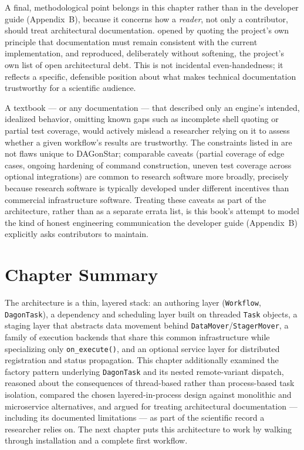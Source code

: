 A final, methodological point belongs in this chapter rather than in the
developer guide (Appendix~B), because it concerns how a \emph{reader},
not only a contributor, should treat architectural documentation.
 opened by quoting the project's own principle that
documentation must remain consistent with the current implementation, and
 reproduced, deliberately without softening, the
project's own list of open architectural debt. This is not incidental
even-handedness; it reflects a specific, defensible position about what
makes technical documentation trustworthy for a scientific audience.

A textbook --- or any documentation --- that described only an engine's
intended, idealized behavior, omitting known gaps such as incomplete shell
quoting or partial test coverage, would actively mislead a researcher
relying on it to assess whether a given workflow's results are
trustworthy. The constraints listed in  are not
flaws unique to DAGonStar; comparable caveats (partial coverage of edge
cases, ongoing hardening of command construction, uneven test coverage
across optional integrations) are common to research software more broadly,
precisely because research software is typically developed under different
incentives than commercial infrastructure software. Treating these caveats
as part of the architecture, rather than as a separate errata list, is this
book's attempt to model the kind of honest engineering communication the
developer guide (Appendix~B) explicitly asks contributors to maintain.

\section{Chapter Summary}

The architecture is a thin, layered stack: an authoring layer
(\texttt{Workflow}, \texttt{DagonTask}), a dependency and scheduling layer
built on threaded \texttt{Task} objects, a staging layer that abstracts data
movement behind \texttt{DataMover}/\texttt{StagerMover}, a family of
execution backends that share this common infrastructure while specializing
only \texttt{on\_execute()}, and an optional service layer for distributed
registration and status propagation. This chapter additionally examined the
factory pattern underlying \texttt{DagonTask} and its nested remote-variant
dispatch, reasoned about the consequences of thread-based rather than
process-based task isolation, compared the chosen layered-in-process design
against monolithic and microservice alternatives, and argued for treating
architectural documentation --- including its documented limitations --- as
part of the scientific record a researcher relies on. The next chapter puts
this architecture to work by walking through installation and a complete
first workflow.

